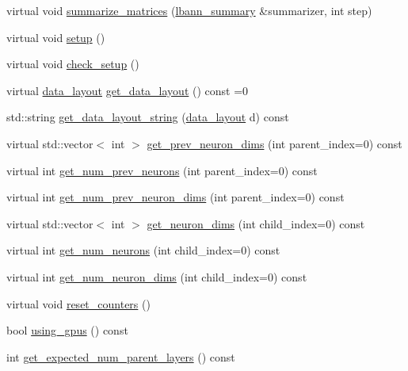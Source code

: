 \begin{DoxyCompactItemize}
\item 
virtual void \hyperlink{classlbann_1_1Layer_af7e50932bb60d4cab3b21ab3fb0707ea}{summarize\+\_\+matrices} (\hyperlink{classlbann_1_1lbann__summary}{lbann\+\_\+summary} \&summarizer, int step)
\item 
virtual void \hyperlink{classlbann_1_1Layer_a93d6048c5959b27aa475673568dab956}{setup} ()
\item 
virtual void \hyperlink{classlbann_1_1Layer_aeec1c710c3d53b5e43a4d4f67b0a21b2}{check\+\_\+setup} ()
\item 
virtual \hyperlink{base_8hpp_a786677cbfb3f5677b4d84f3056eb08db}{data\+\_\+layout} \hyperlink{classlbann_1_1Layer_a5dfb66e81fc085997402a5e2241316bd}{get\+\_\+data\+\_\+layout} () const =0
\item 
std\+::string \hyperlink{classlbann_1_1Layer_ae3f4a5602df821f4221614b1e3782dc1}{get\+\_\+data\+\_\+layout\+\_\+string} (\hyperlink{base_8hpp_a786677cbfb3f5677b4d84f3056eb08db}{data\+\_\+layout} d) const
\item 
virtual std\+::vector$<$ int $>$ \hyperlink{classlbann_1_1Layer_a1acc0fa44acdeffbac158fdac3467973}{get\+\_\+prev\+\_\+neuron\+\_\+dims} (int parent\+\_\+index=0) const
\item 
virtual int \hyperlink{classlbann_1_1Layer_a27112eb70bbfbd7f3c3e749960400dec}{get\+\_\+num\+\_\+prev\+\_\+neurons} (int parent\+\_\+index=0) const
\item 
virtual int \hyperlink{classlbann_1_1Layer_ace32c7df942a8d97d7a25cb8ff8ce71d}{get\+\_\+num\+\_\+prev\+\_\+neuron\+\_\+dims} (int parent\+\_\+index=0) const
\item 
virtual std\+::vector$<$ int $>$ \hyperlink{classlbann_1_1Layer_a54f53393fadbfdc73b4e72489c868433}{get\+\_\+neuron\+\_\+dims} (int child\+\_\+index=0) const
\item 
virtual int \hyperlink{classlbann_1_1Layer_aa4de686cc6c2dd38166f42faf874f227}{get\+\_\+num\+\_\+neurons} (int child\+\_\+index=0) const
\item 
virtual int \hyperlink{classlbann_1_1Layer_aa35561e662de84deae26045ccb53d862}{get\+\_\+num\+\_\+neuron\+\_\+dims} (int child\+\_\+index=0) const
\item 
virtual void \hyperlink{classlbann_1_1Layer_a979bb6891e6bf5edba2184cd0b59cf54}{reset\+\_\+counters} ()
\item 
bool \hyperlink{classlbann_1_1Layer_a6a75532bdaa2ca3879034f2a76085a06}{using\+\_\+gpus} () const
\item 
int \hyperlink{classlbann_1_1Layer_aa30dbf20929aaa58b5be98b98217ca88}{get\+\_\+expected\+\_\+num\+\_\+parent\+\_\+layers} () const

\end{DoxyCompactItemize}
